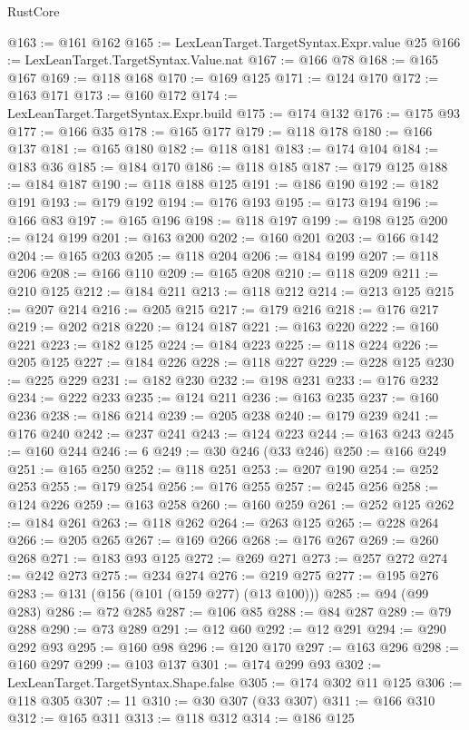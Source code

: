 \begin{lexlean}{RustCore}
\begin{coremodule}
@163 := @161 @162
@165 := LexLeanTarget.TargetSyntax.Expr.value @25
@166 := LexLeanTarget.TargetSyntax.Value.nat
@167 := @166 @78
@168 := @165 @167
@169 := @118 @168
@170 := @169 @125
@171 := @124 @170
@172 := @163 @171
@173 := @160 @172
@174 := LexLeanTarget.TargetSyntax.Expr.build
@175 := @174 @132
@176 := @175 @93
@177 := @166 @35
@178 := @165 @177
@179 := @118 @178
@180 := @166 @137
@181 := @165 @180
@182 := @118 @181
@183 := @174 @104
@184 := @183 @36
@185 := @184 @170
@186 := @118 @185
@187 := @179 @125
@188 := @184 @187
@190 := @118 @188 @125
@191 := @186 @190
@192 := @182 @191
@193 := @179 @192
@194 := @176 @193
@195 := @173 @194
@196 := @166 @83
@197 := @165 @196
@198 := @118 @197
@199 := @198 @125
@200 := @124 @199
@201 := @163 @200
@202 := @160 @201
@203 := @166 @142
@204 := @165 @203
@205 := @118 @204
@206 := @184 @199
@207 := @118 @206
@208 := @166 @110
@209 := @165 @208
@210 := @118 @209
@211 := @210 @125
@212 := @184 @211
@213 := @118 @212
@214 := @213 @125
@215 := @207 @214
@216 := @205 @215
@217 := @179 @216
@218 := @176 @217
@219 := @202 @218
@220 := @124 @187
@221 := @163 @220
@222 := @160 @221
@223 := @182 @125
@224 := @184 @223
@225 := @118 @224
@226 := @205 @125
@227 := @184 @226
@228 := @118 @227
@229 := @228 @125
@230 := @225 @229
@231 := @182 @230
@232 := @198 @231
@233 := @176 @232
@234 := @222 @233
@235 := @124 @211
@236 := @163 @235
@237 := @160 @236
@238 := @186 @214
@239 := @205 @238
@240 := @179 @239
@241 := @176 @240
@242 := @237 @241
@243 := @124 @223
@244 := @163 @243
@245 := @160 @244
@246 := 6
@249 := @30 @246 (@33 @246)
@250 := @166 @249
@251 := @165 @250
@252 := @118 @251
@253 := @207 @190
@254 := @252 @253
@255 := @179 @254
@256 := @176 @255
@257 := @245 @256
@258 := @124 @226
@259 := @163 @258
@260 := @160 @259
@261 := @252 @125
@262 := @184 @261
@263 := @118 @262
@264 := @263 @125
@265 := @228 @264
@266 := @205 @265
@267 := @169 @266
@268 := @176 @267
@269 := @260 @268
@271 := @183 @93 @125
@272 := @269 @271
@273 := @257 @272
@274 := @242 @273
@275 := @234 @274
@276 := @219 @275
@277 := @195 @276
@283 := @131 (@156 (@101 (@159 @277) (@13 @100)))
@285 := @94 (@99 @283)
@286 := @72 @285
@287 := @106 @85
@288 := @84 @287
@289 := @79 @288
@290 := @73 @289
@291 := @12 @60
@292 := @12 @291
@294 := @290 @292 @93
@295 := @160 @98
@296 := @120 @170
@297 := @163 @296
@298 := @160 @297
@299 := @103 @137
@301 := @174 @299 @93
@302 := LexLeanTarget.TargetSyntax.Shape.false
@305 := @174 @302 @11 @125
@306 := @118 @305
@307 := 11
@310 := @30 @307 (@33 @307)
@311 := @166 @310
@312 := @165 @311
@313 := @118 @312
@314 := @186 @125

\end{coremodule}
\end{lexlean}
